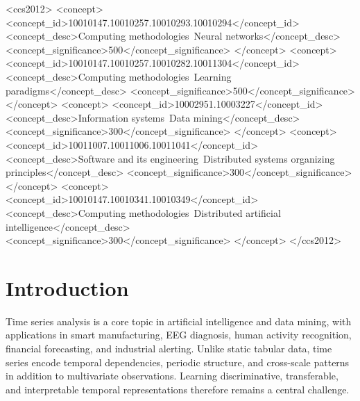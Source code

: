 \documentclass[sigconf]{acmart}
\begin{document}
\begin{CCSXML}
<ccs2012>
   <concept>
       <concept_id>10010147.10010257.10010293.10010294</concept_id>
       <concept_desc>Computing methodologies~Neural networks</concept_desc>
       <concept_significance>500</concept_significance>
   </concept>
   <concept>
       <concept_id>10010147.10010257.10010282.10011304</concept_id>
       <concept_desc>Computing methodologies~Learning paradigms</concept_desc>
       <concept_significance>500</concept_significance>
   </concept>
   <concept>
       <concept_id>10002951.10003227</concept_id>
       <concept_desc>Information systems~Data mining</concept_desc>
       <concept_significance>300</concept_significance>
   </concept>
   <concept>
       <concept_id>10011007.10011006.10011041</concept_id>
       <concept_desc>Software and its engineering~Distributed systems organizing principles</concept_desc>
       <concept_significance>300</concept_significance>
   </concept>
   <concept>
       <concept_id>10010147.10010341.10010349</concept_id>
       <concept_desc>Computing methodologies~Distributed artificial intelligence</concept_desc>
       <concept_significance>300</concept_significance>
   </concept>
</ccs2012>
\end{CCSXML}



\maketitle

\section{Introduction}

Time series analysis is a core topic in artificial intelligence and data mining,
with applications in smart manufacturing, EEG diagnosis, human activity
recognition, financial forecasting, and industrial alerting. Unlike static
tabular data, time series encode temporal dependencies, periodic structure, and
cross-scale patterns in addition to multivariate observations. Learning
discriminative, transferable, and interpretable temporal representations
therefore remains a central challenge.
\end{document}
